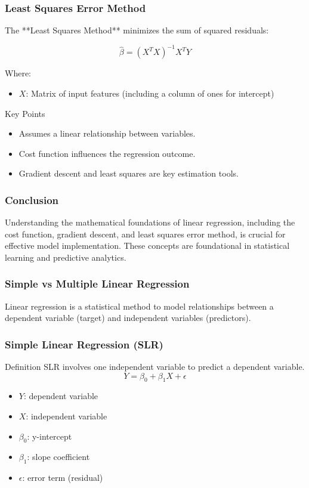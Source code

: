 \documentclass[aspectratio=169]{beamer}
\begin{document}
\begin{frame}[fragile]
    \frametitle{Least Squares Error Method}
    The **Least Squares Method** minimizes the sum of squared residuals:

    \begin{equation}
    \hat{\beta} = (X^TX)^{-1}X^TY
    \end{equation}

    Where:
    \begin{itemize}
        \item \(X\): Matrix of input features (including a column of ones for intercept)
    \end{itemize}

    \begin{block}{Key Points}
        \begin{itemize}
            \item Assumes a linear relationship between variables.
            \item Cost function influences the regression outcome.
            \item Gradient descent and least squares are key estimation tools.
        \end{itemize}
    \end{block}
\end{frame}

\begin{frame}[fragile]
    \frametitle{Conclusion}
    Understanding the mathematical foundations of linear regression, including the cost function, gradient descent, and least squares error method, is crucial for effective model implementation. These concepts are foundational in statistical learning and predictive analytics.
\end{frame}

\begin{frame}[fragile]
    \frametitle{Simple vs Multiple Linear Regression}
    Linear regression is a statistical method to model relationships between a dependent variable (target) and independent variables (predictors).   
\end{frame}

\begin{frame}[fragile]
    \frametitle{Simple Linear Regression (SLR)}
    \begin{block}{Definition}
        SLR involves one independent variable to predict a dependent variable.
        \begin{equation}
            Y = \beta_0 + \beta_1 X + \epsilon
        \end{equation}
    \end{block}
    \begin{itemize}
        \item \( Y \): dependent variable
        \item \( X \): independent variable
        \item \( \beta_0 \): y-intercept
        \item \( \beta_1 \): slope coefficient
        \item \( \epsilon \): error term (residual)
    \end{itemize}
\end{frame}
\end{document}
